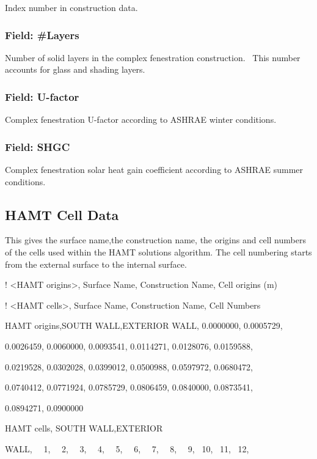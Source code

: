 Index number in construction data.

\subsubsection{Field: \#Layers}\label{field-layers-2}

Number of solid layers in the complex fenestration construction.~ This number accounts for glass and shading layers.

\subsubsection{Field: U-factor}\label{field-u-factor}

Complex fenestration U-factor according to ASHRAE winter conditions.

\subsubsection{Field: SHGC}\label{field-shgc-1}

Complex fenestration solar heat gain coefficient according to ASHRAE summer conditions.

\subsection{HAMT Cell Data}\label{hamt-cell-data}

This gives the surface name,the construction name, the origins and cell numbers of the cells used within the HAMT solutions algorithm. The cell numbering starts from the external surface to the internal surface.

! \textless{}HAMT origins\textgreater{}, Surface Name, Construction Name, Cell origins (m)

! \textless{}HAMT cells\textgreater{}, Surface Name, Construction Name, Cell Numbers

HAMT origins,SOUTH WALL,EXTERIOR WALL, 0.0000000, 0.0005729,

0.0026459, 0.0060000, 0.0093541, 0.0114271, 0.0128076, 0.0159588,

0.0219528, 0.0302028, 0.0399012, 0.0500988, 0.0597972, 0.0680472,

0.0740412, 0.0771924, 0.0785729, 0.0806459, 0.0840000, 0.0873541,

0.0894271, 0.0900000

HAMT cells, SOUTH WALL,EXTERIOR

WALL,~~ 1,~~ 2,~~ 3,~~ 4,~~ 5,~~ 6,~~ 7,~~ 8,~~ 9,~ 10,~ 11,~ 12,

